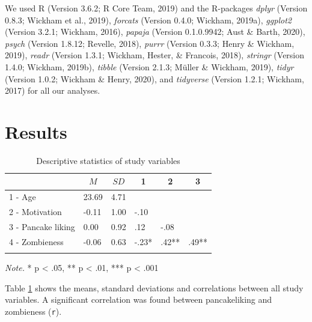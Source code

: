 \documentclass[english,man]{apa6}
\begin{document}
We used R (Version 3.6.2; R Core Team, 2019) and the R-packages \emph{dplyr} (Version 0.8.3; Wickham et al., 2019), \emph{forcats} (Version 0.4.0; Wickham, 2019a), \emph{ggplot2} (Version 3.2.1; Wickham, 2016), \emph{papaja} (Version 0.1.0.9942; Aust \& Barth, 2020), \emph{psych} (Version 1.8.12; Revelle, 2018), \emph{purrr} (Version 0.3.3; Henry \& Wickham, 2019), \emph{readr} (Version 1.3.1; Wickham, Hester, \& Francois, 2018), \emph{stringr} (Version 1.4.0; Wickham, 2019b), \emph{tibble} (Version 2.1.3; Müller \& Wickham, 2019), \emph{tidyr} (Version 1.0.2; Wickham \& Henry, 2020), and \emph{tidyverse} (Version 1.2.1; Wickham, 2017) for all our analyses.

\hypertarget{results}{%
\section{Results}\label{results}}

\begin{table}[tbp]

\begin{center}
\begin{threeparttable}

\caption{\label{tab:descriptivestable}Descriptive statistics of study variables}

\begin{tabular}{llllll}
\toprule
 & \multicolumn{1}{c}{$M$} & \multicolumn{1}{c}{$SD$} & \multicolumn{1}{c}{1} & \multicolumn{1}{c}{2} & \multicolumn{1}{c}{3}\\
\midrule
1 - Age & 23.69 & 4.71 &  &  & \\
2 - Motivation & -0.11 & 1.00 & -.10 &  & \\
3 - Pancake liking & 0.00 & 0.92 & .12 & -.08 & \\
4 - Zombieness & -0.06 & 0.63 & -.23* & .42** & .49**\\
\bottomrule
\addlinespace
\end{tabular}

\begin{tablenotes}[para]
\normalsize{\textit{Note.} * p < .05, ** p < .01, *** p < .001}
\end{tablenotes}

\end{threeparttable}
\end{center}

\end{table}

Table \ref{tab:descriptivestable} shows the means, standard deviations and correlations between all study variables. A significant correlation was found between pancakeliking and zombieness (\texttt{r}).
\end{document}
